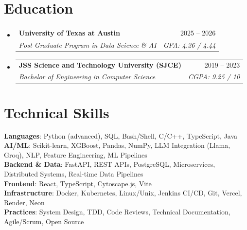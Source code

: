 \documentclass[letterpaper,10.5pt]{article}
\makeatletter
\newcommand{\resumeSubheading}[4]{
  \vspace{-3pt}\item
    \begin{tabular*}{0.97\textwidth}[t]{l@{\extracolsep{\fill}}r}
      \textbf{#1} & #2 \\
      \textit{\small#3} & \textit{\small #4} \\
    \end{tabular*}\vspace{-8pt}
}
\newcommand{\resumeSubHeadingListStart}{\begin{itemize}[leftmargin=0.15in, label={}]}
\newcommand{\resumeSubHeadingListEnd}{\end{itemize}}
\makeatother
\begin{document}
\section{Education}
  \resumeSubHeadingListStart
    \resumeSubheading
      {University of Texas at Austin}{2025 -- 2026}
      {Post Graduate Program in Data Science \& AI}{GPA: 4.26 / 4.44}
    \resumeSubheading
      {JSS Science and Technology University (SJCE)}{2019 -- 2023}
      {Bachelor of Engineering in Computer Science}{CGPA: 9.25 / 10}
  \resumeSubHeadingListEnd

\section{Technical Skills}
 \begin{itemize}[leftmargin=0.15in, label={}]
    \small{\item{
     \textbf{Languages}{: Python (advanced), SQL, Bash/Shell, C/C++, TypeScript, Java} \\
     \textbf{AI/ML}{: Scikit-learn, XGBoost, Pandas, NumPy, LLM Integration (Llama, Groq), NLP, Feature Engineering, ML Pipelines} \\
     \textbf{Backend \& Data}{: FastAPI, REST APIs, PostgreSQL, Microservices, Distributed Systems, Real-time Data Pipelines} \\
     \textbf{Frontend}{: React, TypeScript, Cytoscape.js, Vite} \\
     \textbf{Infrastructure}{: Docker, Kubernetes, Linux/Unix, Jenkins CI/CD, Git, Vercel, Render, Neon} \\
     \textbf{Practices}{: System Design, TDD, Code Reviews, Technical Documentation, Agile/Scrum, Open Source}
    }}
 \end{itemize}
\end{document}
